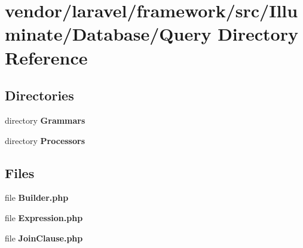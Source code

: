 \section{vendor/laravel/framework/src/\+Illuminate/\+Database/\+Query Directory Reference}
\label{dir_e0c5263dc88f7d59562374300d0c1898}
\subsection*{Directories}
\begin{DoxyCompactItemize}
\item 
directory {\bf Grammars}
\item 
directory {\bf Processors}
\end{DoxyCompactItemize}
\subsection*{Files}
\begin{DoxyCompactItemize}
\item 
file {\bf Builder.\+php}
\item 
file {\bf Expression.\+php}
\item 
file {\bf Join\+Clause.\+php}
\end{DoxyCompactItemize}
